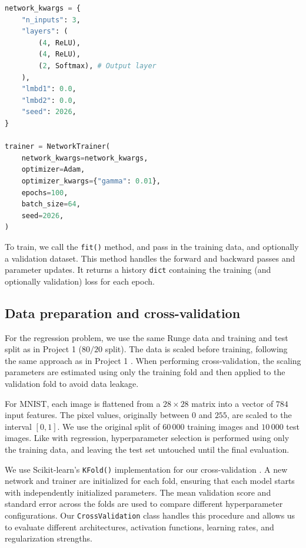 \documentclass[amssymb,secnumarabic,twocolumn,aps]{revtex4}
\begin{document}
\begin{lstlisting}[language=Python, title={Example of initializing a neural network with NetworkTrainer. Layer architecture based on figure \ref{fig:neural_network}.}]
network_kwargs = {
    "n_inputs": 3,
    "layers": (
        (4, ReLU),
        (4, ReLU),
        (2, Softmax), # Output layer
    ),
    "lmbd1": 0.0,
    "lmbd2": 0.0,
    "seed": 2026,
}

trainer = NetworkTrainer(
    network_kwargs=network_kwargs,
    optimizer=Adam,
    optimizer_kwargs={"gamma": 0.01},
    epochs=100,
    batch_size=64,
    seed=2026,
)
\end{lstlisting}

To train, we call the \texttt{fit()} method, and pass in the training data, and optionally a validation dataset. This method handles the forward and backward passes and parameter updates. It returns a history \texttt{dict} containing the training (and optionally validation) loss for each epoch.

\subsection{Data preparation and cross-validation}

For the regression problem, we use the same Runge data and training and test split as in Project 1 ($80/20$ split). The data is scaled before training, following the same approach as in Project 1 \cite{project1}. When performing cross-validation, the scaling parameters are estimated using only the training fold and then applied to the validation fold to avoid data leakage.

For MNIST, each image is flattened from a $28\times 28$ matrix into a vector of $784$ input features. The pixel values, originally between $0$ and $255$, are scaled to the interval $[0,1]$. We use the original split of $60\,000$ training images and $10\,000$ test images. Like with regression, hyperparameter selection is performed using only the training data, and leaving the test set untouched until the final evaluation.

We use Scikit-learn's \texttt{KFold()} implementation for our cross-validation \cite{scikit-learn}. A new network and trainer are initialized for each fold, ensuring that each model starts with independently initialized parameters. The mean validation score and standard error across the folds are used to compare different hyperparameter configurations. Our \texttt{CrossValidation} class handles this procedure and allows us to evaluate different architectures, activation functions, learning rates, and regularization strengths.
\end{document}
